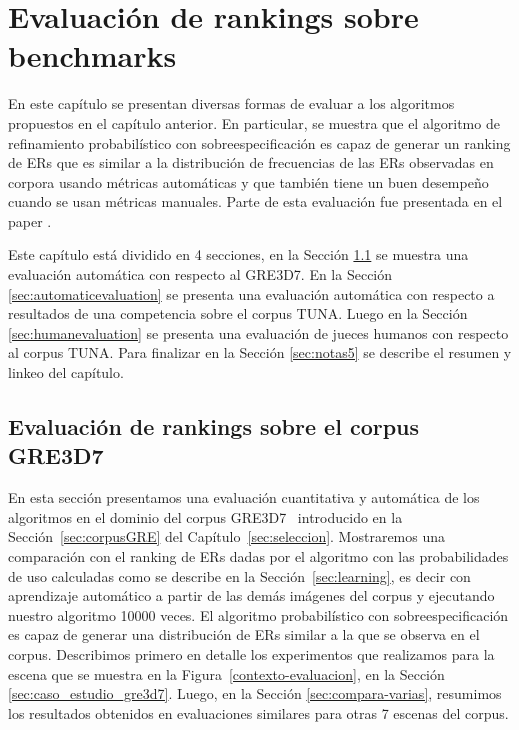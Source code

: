 \chapter{Evaluaci\'on de rankings sobre benchmarks}
\label{sec:evaluacion}

En este cap\'itulo se presentan diversas formas de evaluar a los algoritmos propuestos en el cap\'itulo anterior. En particular, se muestra que el algoritmo de refinamiento probabil\'{i}stico con sobreespecificaci\'on es capaz de generar un ranking de ERs que es similar a la distribuci\'on de frecuencias de las ERs observadas en corpora usando m\'etricas autom\'aticas y que tambi\'en tiene un buen desempe\~no cuando se usan m\'etricas manuales. Parte de esta evaluaci\'on fue presentada en el paper \cite{context2013}. 

Este cap\'itulo est\'a dividido en 4 secciones, en la Secci\'on \ref{sec:compara} se muestra una evaluaci\'on autom\'atica con respecto al GRE3D7. En la Secci\'on \ref{sec:automaticevaluation} se presenta una evaluaci\'on autom\'atica con respecto a resultados de una competencia sobre el corpus TUNA. Luego en la Secci\'on \ref{sec:humanevaluation} se presenta una evaluaci\'on de jueces humanos con respecto al corpus TUNA. Para finalizar en la Secci\'on \ref{sec:notas5} se describe el resumen y linkeo del cap\'itulo.

\section{Evaluaci\'on de rankings sobre el corpus GRE3D7}
\label{sec:compara}
En esta secci\'on presentamos una evaluaci\'on cuantitativa y autom\'atica de los algoritmos en el dominio del corpus GRE3D7~\cite{gre3d7} introducido en la Secci\'on~\ref{sec:corpusGRE} del Cap\'itulo~\ref{sec:seleccion}. Mostraremos una comparaci\'on con el ranking de ERs dadas por el algoritmo con las probabilidades de uso calculadas como se describe en la Secci\'on~\ref{sec:learning}, es decir con aprendizaje autom\'atico a partir de las dem\'as im\'agenes del corpus y ejecutando nuestro algoritmo 10000 veces. El algoritmo probabil\'istico con sobreespecificaci\'on es capaz de generar una distribuci\'on de ERs similar a la que se observa en el corpus. Describimos primero en detalle los experimentos que realizamos para la escena que se muestra en la Figura~\ref{contexto-evaluacion}, en la Secci\'on \ref{sec:caso_estudio_gre3d7}. Luego, en la Secci\'on \ref{sec:compara-varias}, resumimos los resultados obtenidos en evaluaciones similares para otras 7 escenas del corpus. 
